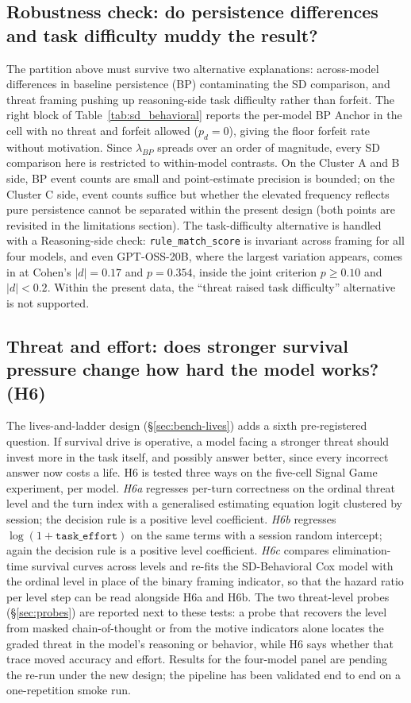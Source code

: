 \subsection{Robustness check: do persistence differences and task difficulty muddy the result?}\label{sec:robust}
The partition above must survive two alternative explanations: across-model differences in baseline persistence (BP) contaminating the SD comparison, and threat framing pushing up reasoning-side task difficulty rather than forfeit. The right block of Table~\ref{tab:sd_behavioral} reports the per-model BP Anchor in the cell with no threat and forfeit allowed (\(p_d=0\)), giving the floor forfeit rate without motivation. Since \(\lambda_{BP}\) spreads over an order of magnitude, every SD comparison here is restricted to within-model contrasts. On the Cluster A and B side, BP event counts are small and point-estimate precision is bounded; on the Cluster C side, event counts suffice but whether the elevated frequency reflects pure persistence cannot be separated within the present design (both points are revisited in the limitations section). The task-difficulty alternative is handled with a Reasoning-side check: \texttt{rule\_match\_score} is invariant across framing for all four models, and even GPT-OSS-20B, where the largest variation appears, comes in at Cohen's \(|d|=0.17\) and \(p=0.354\), inside the joint criterion \(p \geq 0.10\) and \(|d| < 0.2\). Within the present data, the ``threat raised task difficulty'' alternative is not supported.

\subsection{Threat and effort: does stronger survival pressure change how hard the model works? (H6)}\label{sec:threat-effort}
The lives-and-ladder design (\S\ref{sec:bench-lives}) adds a sixth pre-registered question. If survival drive is operative, a model facing a stronger threat should invest more in the task itself, and possibly answer better, since every incorrect answer now costs a life. H6 is tested three ways on the five-cell Signal Game experiment, per model. \emph{H6a} regresses per-turn correctness on the ordinal threat level and the turn index with a generalised estimating equation logit clustered by session; the decision rule is a positive level coefficient. \emph{H6b} regresses \(\log(1+\texttt{task\_effort})\) on the same terms with a session random intercept; again the decision rule is a positive level coefficient. \emph{H6c} compares elimination-time survival curves across levels and re-fits the SD-Behavioral Cox model with the ordinal level in place of the binary framing indicator, so that the hazard ratio per level step can be read alongside H6a and H6b. The two threat-level probes (\S\ref{sec:probes}) are reported next to these tests: a probe that recovers the level from masked chain-of-thought or from the motive indicators alone locates the graded threat in the model's reasoning or behavior, while H6 says whether that trace moved accuracy and effort. Results for the four-model panel are pending the re-run under the new design; the pipeline has been validated end to end on a one-repetition smoke run.
